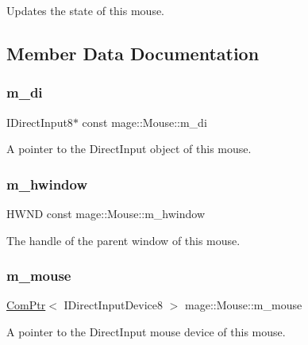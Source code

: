 Updates the state of this mouse. 

\subsection{Member Data Documentation}
\hypertarget{classmage_1_1_mouse_a892a9e1d5ad16ac9b67a5f69fbfedeab}{}\label{classmage_1_1_mouse_a892a9e1d5ad16ac9b67a5f69fbfedeab} 
\subsubsection{\texorpdfstring{m\+\_\+di}{m\_di}}
{\footnotesize\ttfamily I\+Direct\+Input8$\ast$ const mage\+::\+Mouse\+::m\+\_\+di\hspace{0.3cm}{\ttfamily [private]}}

A pointer to the Direct\+Input object of this mouse. \hypertarget{classmage_1_1_mouse_a6389e45df78cc792f11aa5395507deab}{}\label{classmage_1_1_mouse_a6389e45df78cc792f11aa5395507deab} 
\subsubsection{\texorpdfstring{m\+\_\+hwindow}{m\_hwindow}}
{\footnotesize\ttfamily H\+W\+ND const mage\+::\+Mouse\+::m\+\_\+hwindow\hspace{0.3cm}{\ttfamily [private]}}

The handle of the parent window of this mouse. \hypertarget{classmage_1_1_mouse_a3f2803f3c0e008f5d764a11de3dbe098}{}\label{classmage_1_1_mouse_a3f2803f3c0e008f5d764a11de3dbe098} 
\subsubsection{\texorpdfstring{m\+\_\+mouse}{m\_mouse}}
{\footnotesize\ttfamily \hyperlink{namespacemage_ae74f374780900893caa5555d1031fd79}{Com\+Ptr}$<$ I\+Direct\+Input\+Device8 $>$ mage\+::\+Mouse\+::m\+\_\+mouse\hspace{0.3cm}{\ttfamily [private]}}

A pointer to the Direct\+Input mouse device of this mouse. \hypertarget{classmage_1_1_mouse_a0f5a38e23bdf7eae1b7b1030a53edff0}{}\label{classmage_1_1_mouse_a0f5a38e23bdf7eae1b7b1030a53edff0} 
